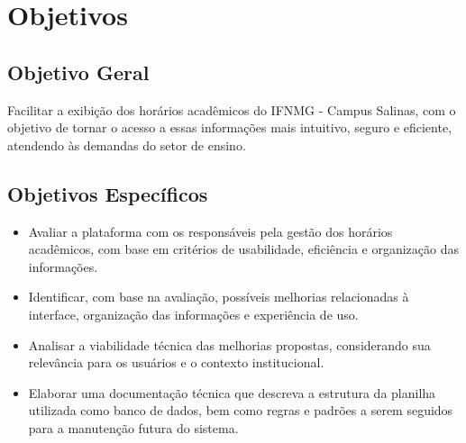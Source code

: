 \chapter{Objetivos} 
\label{cap2_objetivos} 

\section{Objetivo Geral}

Facilitar a exibição dos horários acadêmicos do IFNMG - Campus Salinas, com o objetivo de tornar o acesso a essas informações mais intuitivo, seguro e eficiente, atendendo às demandas do setor de ensino.

\section{Objetivos Específicos}

\begin{itemize}
    \item Avaliar a plataforma com os responsáveis pela gestão dos horários acadêmicos, com base em critérios de usabilidade, eficiência e organização das informações.
    \item Identificar, com base na avaliação, possíveis melhorias relacionadas à interface, organização das informações e experiência de uso.
    \item Analisar a viabilidade técnica das melhorias propostas, considerando sua relevância para os usuários e o contexto institucional.
    \item Elaborar uma documentação técnica que descreva a estrutura da planilha utilizada como banco de dados, bem como regras e padrões a serem seguidos para a manutenção futura do sistema.
\end{itemize}